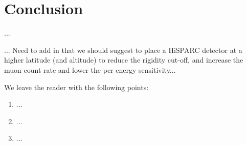 \section{Conclusion}\label{sec:HS_conclusion}

...

... Need to add in that we should suggest to place a HiSPARC detector at a higher latitude (and altitude) to reduce the rigidity cut-off, and increase the muon count rate and lower the pcr energy sensitivity...

We leave the reader with the following points:

\begin{enumerate}
	\item{...}
	\item{...}
	\item{...}
\end{enumerate}